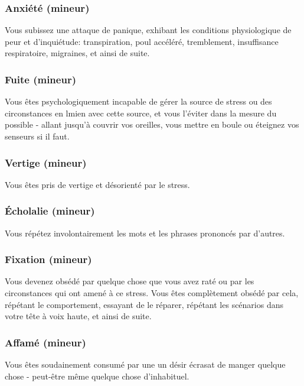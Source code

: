 \subsubsection{Anxiété (mineur)} 

Vous subissez une attaque de panique, exhibant les conditions physiologique de peur et d'inquiétude: transpiration, poul accéléré, tremblement, insuffisance respiratoire, migraines, et ainsi de suite. 

\subsubsection{Fuite (mineur)} 

Vous êtes psychologiquement incapable de gérer la source de stress ou des circonstances en lmien avec cette source, et vous l'éviter dans la mesure du possible - allant jusqu'à couvrir vos oreilles, vous mettre en boule ou éteignez vos senseurs si il faut. 

\subsubsection{Vertige (mineur)} 

Vous êtes pris de vertige et désorienté par le stress. 

\subsubsection{Écholalie (mineur)} 

Vous répétez involontairement les mots et les phrases prononcés par d'autres. 

\subsubsection{Fixation (mineur)} 

Vous devenez obsédé par quelque chose que vous avez raté ou par les circonstances qui ont amené à ce stress. Vous êtes complètement obsédé par cela, répétant le comportement, essayant de le réparer, répétant les scénarios dans votre tête à voix haute, et ainsi de suite. 

\subsubsection{Affamé (mineur)} 

Vous êtes soudainement consumé par une un désir écrasat de manger quelque chose - peut-être même quelque chose d'inhabituel. 


